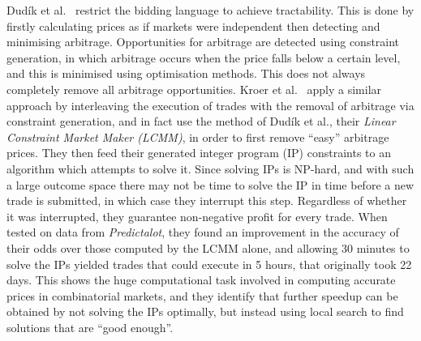 Dud\'ik et al.~\cite{Dudik2012} restrict the bidding language to achieve
tractability. This is done by firstly calculating prices as if markets were
independent then detecting and minimising arbitrage. Opportunities for arbitrage
are detected using constraint generation, in which arbitrage occurs when the
price falls below a certain level, and this is minimised using optimisation
methods. This does not always completely remove all arbitrage opportunities.
Kroer et al.~\cite{Kroer2016} apply a similar approach by interleaving the
execution of trades with the removal of arbitrage via constraint generation,
and in fact use the method of Dud\'ik et al., their \emph{Linear Constraint
Market Maker (LCMM)}, in order to first remove ``easy'' arbitrage prices. They then
feed their generated integer program (IP) constraints to an algorithm which
attempts to solve it. Since solving IPs is NP-hard, and with such a large
outcome space there may not be time to solve the IP in time before a new trade
is submitted, in which case they interrupt this step. Regardless of whether it
was interrupted, they guarantee non-negative profit for every trade. When
tested on data from \emph{Predictalot}, they found an improvement in the
accuracy of their odds over those computed by the LCMM alone, and allowing 30
minutes to solve the IPs yielded trades that could execute in 5 hours, that
originally took 22 days. This shows the huge computational task involved in
computing accurate prices in combinatorial markets, and they identify that
further speedup can be obtained by not solving the IPs optimally, but instead
using local search to find solutions that are ``good enough''.
